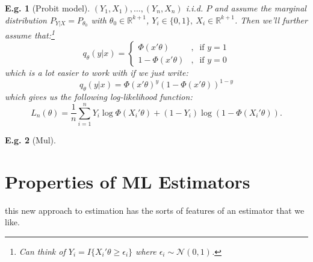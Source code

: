 \documentclass{tufte-book}
\theoremstyle{mytheoremstyle}
\theoremstyle{mylemstyle}
\theoremstyle{mydefstyle}
\newtheorem*{ex}{E.g.}
\begin{document}
\begin{ex}[Probit model] \((Y_1, X_1), \dots, (Y_n, X_n)\) i.i.d. \(P\) and assume the marginal distribution \(P_{Y|X} = P_{\theta_0}\) with \(\theta_0 \in \mathbb{R}^{k+1}\), \(Y_i \in \{0,1\},\ X_i \in \mathbb{R}^{k+1}\). Then we'll further assume that:\footnote{Can think of \(Y_i = I\{X_i'\theta \ge \epsilon_i\}\) where \(\epsilon_i \sim \mathcal{N}(0,1)\).}
	\[q_\theta(y | x) = \begin{cases} \Phi(x'\theta)&,\ \text{ if } y = 1 \\ 1-\Phi(x'\theta)&,\ \text{ if } y = 0 \end{cases}\]
which is a lot easier to work with if we just write:
	\[q_\theta(y|x) = \Phi(x'\theta)^y (1-\Phi(x'\theta))^{1-y}\]
which gives us the following log-likelihood function:
	\[L_n(\theta) = \frac{1}{n} \sum_{i=1}^n Y_i \log \Phi(X_i'\theta) + (1-Y_i)\log(1-\Phi(X_i'\theta))\text{.}\]
\end{ex}

\begin{ex}[Mul] \end{ex}

\section{Properties of ML Estimators}
 this new approach to estimation has the sorts of features of an estimator that we like. 
\end{document}
